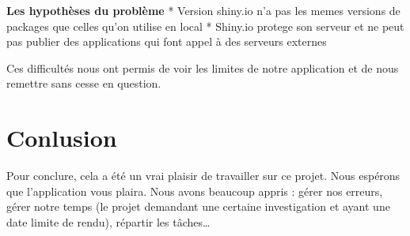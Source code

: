 \documentclass[
]{article}
\begin{document}
\textbf{Les hypothèses du problème} * Version shiny.io n'a pas les memes
versions de packages que celles qu'on utilise en local * Shiny.io
protege son serveur et ne peut pas publier des applications qui font
appel à des serveurs externes

Ces difficultés nous ont permis de voir les limites de notre application
et de nous remettre sans cesse en question.

\hypertarget{conlusion}{%
\section{Conlusion}\label{conlusion}}

Pour conclure, cela a été un vrai plaisir de travailler sur ce projet.
Nous espérons que l'application vous plaira. Nous avons beaucoup appris
: gérer nos erreurs, gérer notre temps (le projet demandant une certaine
investigation et ayant une date limite de rendu), répartir les
tâches\ldots{}
\end{document}
